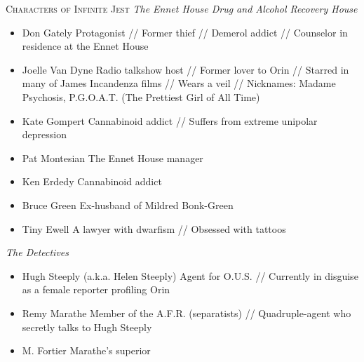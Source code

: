 \documentclass{article}
\begin{document}
\begin{tcolorbox}[height=26cm]
\centering
\huge\textsc{Characters of Infinite Jest}
\small
\vspace{0.2cm}
\decorule
\vspace{0.2cm}
\large\emph{The Ennet House Drug and Alcohol Recovery House}
\small
\begin{itemize}
\item  \small{Don Gately}\newline
\scriptsize{Protagonist // Former thief // Demerol addict // Counselor in residence at the Ennet House}
\item  \small{Joelle Van Dyne}\newline
\scriptsize{Radio talkshow host // Former lover to Orin // Starred in many of James Incandenza films // Wears a veil // Nicknames: Madame Psychosis, P.G.O.A.T. (The Prettiest Girl of All Time)}
\item  \small{Kate Gompert}\newline
\scriptsize{Cannabinoid addict // Suffers from extreme unipolar depression}
\item  \small{Pat Montesian}\newline
\scriptsize{The Ennet House manager}
\item  \small{Ken Erdedy}\newline
\scriptsize{Cannabinoid addict}
\item  \small{Bruce Green}\newline
\scriptsize{Ex-husband of Mildred Bonk-Green}
\item  \small{Tiny Ewell}\newline
\scriptsize{A lawyer with dwarfism // Obsessed with tattoos}
\end{itemize}
\vspace{0.1cm}
\large\emph{The Detectives}
\small
\begin{itemize}
\item  \small{Hugh Steeply (a.k.a. Helen Steeply)}\newline
\scriptsize{Agent for O.U.S. // Currently in disguise as a female reporter profiling Orin}
\item  \small{Remy Marathe}\newline
\scriptsize {Member of the A.F.R. (separatists) // Quadruple-agent who secretly talks to Hugh Steeply}
\item  \small{M. Fortier}\newline
\scriptsize{Marathe's superior}
\end{itemize}
\vspace{0.1cm}

\end{tcolorbox}
\end{document}
